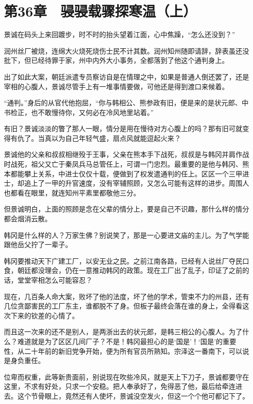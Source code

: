\section{第36章　骎骎载骤探寒温（上）}

景诚在码头上来回踱步，时不时的抬头望着江面，心中焦躁，“怎么还没到？”

润州丝厂被烧，连绵大火烧死烧伤士民不计其数。润州知州随即请辞，辞表虽还没批下，但已经待罪于家，州中内外大小事务，全都落到了他这个通判身上。

出了如此大案，朝廷派遣专员察访自是在情理之中，如果是普通人倒还罢了，还是宰相的心腹人，景诚尽管手上有一堆事情要做，可他还是得到渡口来候着。

“通判。”身后的从官代他抱屈，“你与韩相公、熊参政有旧，便是来的是状元郎、中书检正，也不敢慢待你，又何必在冷风地里站着。”

有旧？景诚淡淡的瞥了那人一眼，情分是用在慢待对方心腹上的吗？那有旧可就变得有仇了。当真以为自己年轻气盛，扇点风就能逗起火来？

景诚他的父亲和叔叔相继殁于王事，父亲在熊本手下战死，叔叔是与韩冈并肩作战时战死，祖父又亡于秦凤兵马总管任上，可谓一门忠烈。最重要的是他与韩冈、熊本都能攀上关系，中进士仅仅十载，便做到了权发遣通判的任上。区区一个三甲进士，却追上了一甲的升官速度，没有宰辅照顾，又怎么可能有这样的进步。周围人也都看在眼里，就连知州平素里都敬他三分。

但景诚明白，上面的照顾是念在父辈的情分上，要是自己不识趣，那什么样的情分都会烟消云散。

韩冈是什么样的人？万家生佛？别说笑了，那是一心要进文庙的主儿。为了气学能跟他岳父拧了一辈子。

韩冈要推动天下广建工厂，以安无业之民。之前江南各路，已经有人说丝厂夺民口食，朝廷都没理会，仍在一意推动韩冈的政策。现在工厂出了乱子，印证了之前的话，堂堂宰相怎么可能容忍？

现在，几百条人命大案，败坏了他的法度，坏了他的学术，管束不力的州县，还有几位贪鄙害民的工厂东主，谁都脱不了身。但板子最终会落在谁的身上，全得看这次下来的钦差的心情了。

而且这一次来的还不是别人，是两浙出去的状元郎，是韩三相公的心腹人。为了什么？难道就是为了区区几间厂子？不是！韩冈最担心的是‘国是’！‘国是’的重要性，从二十年前的新旧党争开始，便为所有官员所熟知。宗泽这一番南下，可以说是身负重任。

位卑而权重，此等新贵面前，别说现在吹些冷风，就是天上下刀子，景诚都要守在这里，不求有好处，只求一个安稳。把人奉承好了，免得恶了他，最后给牵连进去。这个节骨眼上，竟然还有人使坏，景诚没空发火，但这一个个他可都记下了。

